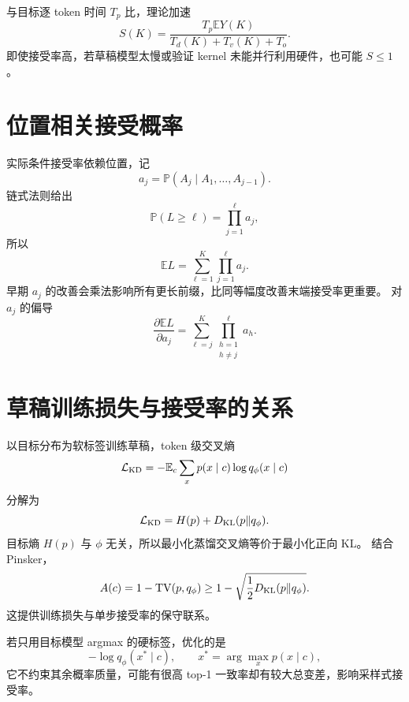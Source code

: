 \documentclass[11pt]{article}
\numberwithin{equation}{section}
\newcommand{\E}{\mathbb{E}}
\newcommand{\Pp}{\mathbb{P}}
\newcommand{\1}{\mathbf{1}}
\newcommand{\cL}{\mathcal{L}}
\begin{document}
与目标逐 token 时间 $T_p$ 比，理论加速
\begin{equation}
 S(K)=\frac{T_p\E Y(K)}{T_d(K)+T_v(K)+T_o}.
\end{equation}
即使接受率高，若草稿模型太慢或验证 kernel 未能并行利用硬件，也可能 $S\le1$。

\section{位置相关接受概率}

实际条件接受率依赖位置，记
\begin{equation}
 a_j=\Pp(A_j\mid A_1,\ldots,A_{j-1}).
\end{equation}
链式法则给出
\begin{equation}
 \Pp(L\ge\ell)=\prod_{j=1}^{\ell}a_j,
\end{equation}
所以
\begin{equation}
 \boxed{\E L=\sum_{\ell=1}^{K}\prod_{j=1}^{\ell}a_j.}
\end{equation}
早期 $a_j$ 的改善会乘法影响所有更长前缀，比同等幅度改善末端接受率更重要。
对 $a_j$ 的偏导
\begin{equation}
 \frac{\partial\E L}{\partial a_j}
 =\sum_{\ell=j}^{K}\prod_{\substack{h=1\\h\ne j}}^{\ell}a_h.
\end{equation}

\section{草稿训练损失与接受率的关系}

以目标分布为软标签训练草稿，token 级交叉熵
\begin{equation}
 \cL_{\rm KD}=-\E_{c}\sum_xp(x\mid c)\log q_\phi(x\mid c)
\end{equation}
分解为
\begin{equation}
 \cL_{\rm KD}=H(p)+D_{\rm KL}(p\|q_\phi).
\end{equation}
目标熵 $H(p)$ 与 $\phi$ 无关，所以最小化蒸馏交叉熵等价于最小化正向 KL。
结合 Pinsker，
\begin{equation}
 A(c)=1-\operatorname{TV}(p,q_\phi)
 \ge1-\sqrt{\frac12D_{\rm KL}(p\|q_\phi)}.
\end{equation}
这提供训练损失与单步接受率的保守联系。

若只用目标模型 argmax 的硬标签，优化的是
\begin{equation}
 -\log q_\phi(x^*\mid c),\qquad x^*=\arg\max_xp(x\mid c),
\end{equation}
它不约束其余概率质量，可能有很高 top-1 一致率却有较大总变差，影响采样式接受率。
\end{document}
